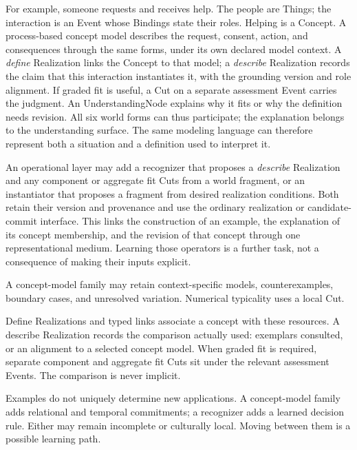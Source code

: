 \documentclass[11pt,a4paper]{article}
\begin{document}


\begin{samepage}
For example, someone requests and receives help. The people are Things; the
interaction is an Event whose Bindings state their roles. Helping is a Concept.
A process-based concept model describes the request, consent, action, and
consequences through the same forms, under its own declared model context.
A \emph{define} Realization links the Concept to that model; a \emph{describe}
Realization records the claim that this interaction instantiates it, with the
grounding version and role alignment. If graded fit is useful, a Cut on a
separate assessment Event carries the judgment. An UnderstandingNode explains
why it fits or why the definition needs revision. All six world forms can thus
participate; the explanation belongs to the understanding surface. The same
modeling language can therefore represent both a situation and a definition
used to interpret it.

\end{samepage}

An operational layer may add a recognizer that proposes a \emph{describe}
Realization and any component or aggregate fit Cuts from a world fragment, or
an instantiator that proposes a fragment from desired realization conditions.
Both retain their version and provenance and use the ordinary realization or
candidate-commit interface. This links the construction of an
example, the explanation of its concept membership, and the revision of that
concept through one representational medium. Learning those operators is a
further task, not a consequence of making their inputs explicit.

A concept-model family may retain context-specific models, counterexamples,
boundary cases, and unresolved variation. Numerical typicality uses a local Cut.

Define Realizations and typed links associate a concept with these resources.
A describe Realization records the comparison actually used: exemplars
consulted, or an alignment to a selected concept model. When graded fit is
required, separate component and aggregate fit Cuts sit under the relevant
assessment Events. The comparison is never implicit.

Examples do not uniquely determine new applications. A concept-model family adds
relational and temporal commitments; a recognizer adds a learned decision rule.
Either may remain incomplete or culturally local. Moving between them is a
possible learning path.
\end{document}
